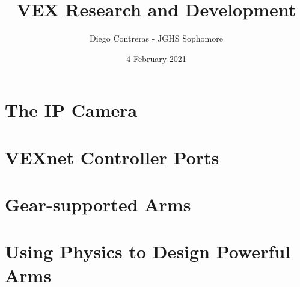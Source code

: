 \documentclass[12pt]{article}
\title{VEX Research and Development}
\author{Diego Contreras - JGHS Sophomore}
\date{4 February 2021}
\begin{document}
\maketitle
\newpage
\tableofcontents



\newpage
\section{The IP Camera}







\section{VEXnet Controller Ports}
\section{Gear-supported Arms}
\section{Using Physics to Design Powerful Arms}



\end{document}
